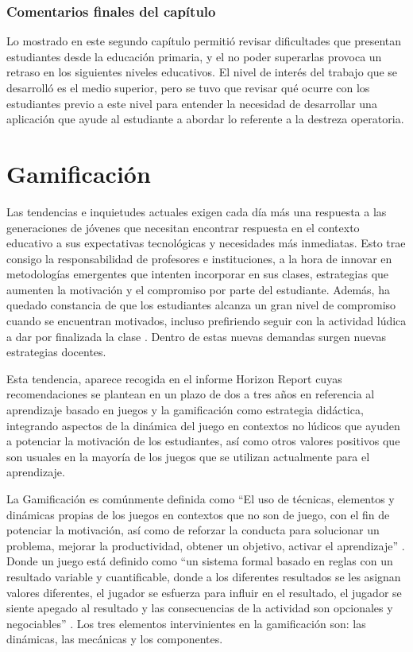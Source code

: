 \documentclass{article}
\begin{document}
\subsubsection{Comentarios finales del capítulo} 

Lo mostrado en este segundo capítulo permitió revisar dificultades que presentan estudiantes desde la educación primaria, y el no poder superarlas provoca un retraso  en los siguientes niveles educativos. El nivel de interés del trabajo que se desarrolló es el medio superior, pero se tuvo que revisar qué ocurre con los estudiantes previo a este nivel para entender la necesidad de desarrollar una aplicación que ayude al estudiante a abordar lo referente a la destreza operatoria.

\pagebreak
\section{Gamificación}
Las tendencias e inquietudes actuales exigen cada día más una respuesta a las generaciones de jóvenes que necesitan encontrar respuesta en el contexto educativo a sus expectativas tecnológicas y necesidades más inmediatas. Esto trae consigo la responsabilidad de profesores e instituciones, a la hora de innovar en metodologías emergentes que intenten incorporar en sus clases, estrategias que aumenten la motivación y el compromiso por parte del estudiante. Además, ha quedado constancia de que los estudiantes alcanza un gran nivel de compromiso cuando se encuentran motivados, incluso prefiriendo seguir con la actividad lúdica a dar por finalizada la clase \cite{fernandez2016pedagogical}. Dentro de estas nuevas demandas surgen nuevas estrategias docentes. 

Esta tendencia, aparece recogida en el informe Horizon Report \cite{johnson2016nmc} cuyas recomendaciones se plantean en un plazo de dos a tres años en referencia al aprendizaje basado en juegos y la gamificación como estrategia didáctica, integrando aspectos de la dinámica del juego en contextos no lúdicos que ayuden a potenciar la motivación de los estudiantes, así como otros valores positivos que son usuales en la mayoría de los juegos que se utilizan actualmente para el aprendizaje.


La Gamificación es comúnmente definida como “El uso de técnicas, elementos y dinámicas propias de los juegos en contextos que no son de juego, con el fin de potenciar la motivación, así como de reforzar la conducta para solucionar un problema, mejorar la productividad, obtener un objetivo, activar el aprendizaje” \cite{robson2015all}. Donde un juego está definido como “un sistema formal basado en reglas con un resultado variable y cuantificable, donde a los diferentes resultados se les asignan valores diferentes, el jugador se esfuerza para influir en el resultado, el jugador se siente apegado al resultado y las consecuencias de la actividad son opcionales y negociables” \cite{zichermann2011gamification}.
Los tres elementos intervinientes en la gamificación son: \cite{hunter2012win} las dinámicas, las mecánicas y los componentes. 
\end{document}
